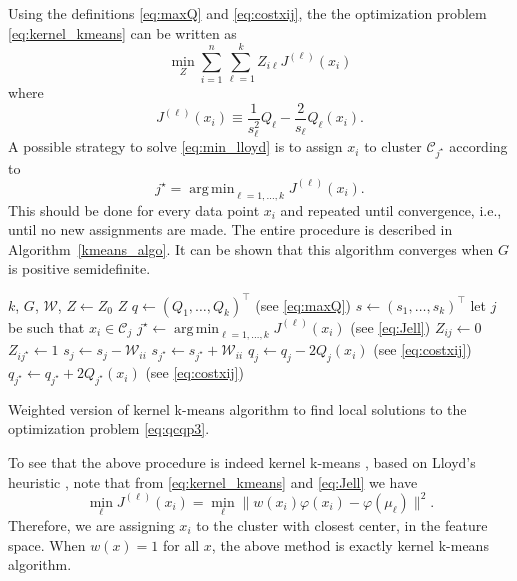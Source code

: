 \documentclass[10pt,journal,compsoc]{IEEEtran}
\DeclareMathOperator*{\argmin}{arg\,min}
\newcommand\C{{\mathcal{C}}}
\begin{document}
Using the definitions \eqref{eq:maxQ} and \eqref{eq:costxij}, the
the optimization problem \eqref{eq:kernel_kmeans} can be written as 
\begin{equation}
\label{eq:min_lloyd}
\min_{Z} \sum_{i = 1}^{n} \sum_{\ell=1}^{k} Z_{i\ell} J^{(\ell)}(x_i)
\end{equation}
where
\begin{equation}
\label{eq:Jell}
J^{(\ell)}(x_i) \equiv 
\dfrac{1}{s_\ell^2} Q_\ell
-\dfrac{2}{s_\ell} Q_\ell(x_i) .
\end{equation}
A possible strategy to solve \eqref{eq:min_lloyd} is to
assign  $x_i$ to cluster $\C_{j^\star}$ according
to 
\begin{equation}
\label{eq:min_lloyd2}
j^\star = \argmin_{\ell=1,\dotsc,k} J^{(\ell)}(x_i) .
\end{equation}
This should be done for every data point $x_i$ and repeated until
convergence, i.e., until no new assignments are made.
The entire procedure is described in Algorithm~\ref{kmeans_algo}.
It can be shown that this algorithm converges when $G$ is positive
semidefinite. 

\begin{algorithm}[t]
\begin{algorithmic}[1]
    \INPUT $k$, $G$, $\mathcal{W}$, $Z \leftarrow Z_0$
    \OUTPUT $Z$ 
  \STATE $q \leftarrow (Q_1, \dotsc, Q_k)^\top$ 
            \hfill (see \eqref{eq:maxQ})
  \STATE $s \leftarrow (s_1,\dotsc,s_k)^\top$ 
  \REPEAT
        \STATE let $j$ be such that $x_i \in \C_j$
        \STATE $j^\star \leftarrow \argmin_{\ell=1,\dotsc,k} J^{(\ell)}(x_i)$
            \hfill (see \eqref{eq:Jell})
            \STATE $Z_{ij} \leftarrow 0$ 
            \STATE $Z_{ij^\star} \leftarrow 1$
            \STATE $s_j \leftarrow s_j - \mathcal{W}_{ii}$ 
            \STATE $s_{j^\star} \leftarrow s_{j^\star} + \mathcal{W}_{ii}$
            \STATE $q_j \leftarrow q_j - 2Q_j(x_i)$ 
            \hfill (see \eqref{eq:costxij})
            \STATE $q_{j^\star} \leftarrow q_{j^\star} + 2Q_{j^\star}(x_i)$
            \hfill (see \eqref{eq:costxij})
        \ENDIF
    \ENDFOR
\end{algorithmic}
\caption{\label{kmeans_algo}
Weighted version of kernel k-means algorithm
to find local solutions to the optimization problem 
\eqref{eq:qcqp3}.
}
\end{algorithm}

To see that the above procedure is indeed kernel k-means
\cite{Dhillon2,Dhillon}, based
on Lloyd's heuristic \cite{Lloyd}, note that from \eqref{eq:kernel_kmeans} 
and \eqref{eq:Jell} we have
\begin{equation}
\label{eq:closest_mean}
\min_\ell J^{(\ell)}(x_i) = 
\min_\ell \| w(x_i) \varphi(x_i) - \varphi(\mu_\ell)\|^2.
\end{equation}
Therefore, we are 
assigning $x_i$ to the cluster with closest center, in the
feature space.
When $w(x) = 1$ for all $x$, the above method  is exactly 
kernel k-means algorithm.
\end{document}
